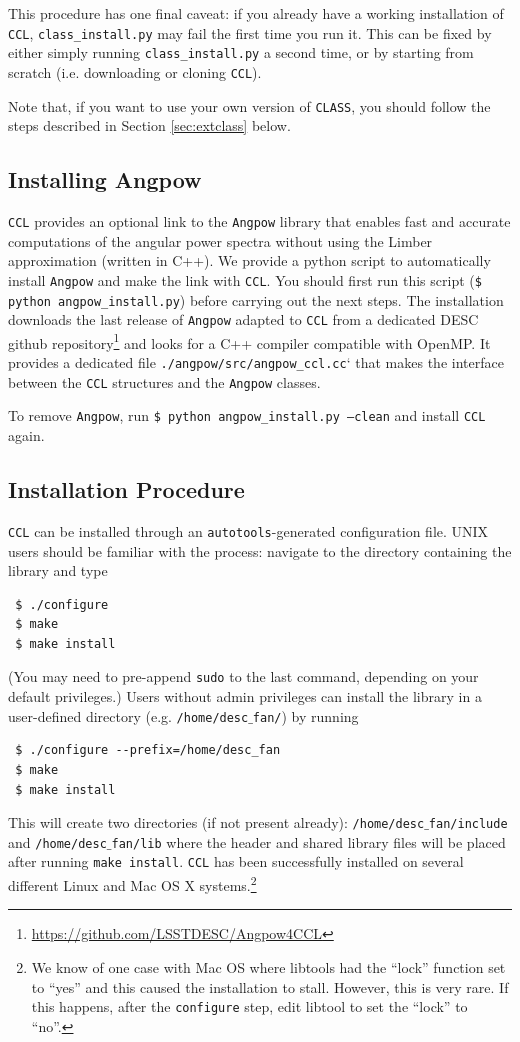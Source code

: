 \documentclass[\docopts]{\docclass}
\newcommand{\ccl}{{\tt CCL}\xspace}
\begin{document}
  This procedure has one final caveat: if you already have a working installation of {\tt CCL}, {\tt class\_install.py} may fail the first time you run it. This can be fixed by either simply running {\tt class\_install.py} a second time, or by starting from scratch (i.e. downloading or cloning {\tt CCL}).

  Note that, if you want to use your own version of {\tt CLASS}, you should follow the steps described in Section \ref{sec:extclass} below.

\subsection{Installing Angpow}

{\tt CCL} provides an optional link to the {\tt Angpow} library that enables fast and accurate computations of the angular power spectra without using the Limber approximation (written in C++). We provide a python script to automatically install {\tt Angpow} and make the link with {\tt CCL}. You should first run this script ({\tt \$ python angpow\_install.py}) before carrying out the next steps. The installation downloads the last release of {\tt Angpow} adapted to {\tt CCL} from a dedicated DESC github repository\footnote{\url{https://github.com/LSSTDESC/Angpow4CCL}} and looks for a C++ compiler compatible with OpenMP. It provides a dedicated file {\tt ./angpow/src/angpow\_ccl.cc}` that makes the interface between the {\tt CCL} structures and the {\tt Angpow} classes.

To remove {\tt Angpow}, run {\tt \$ python angpow\_install.py --clean} and install {\tt CCL} again.



\subsection{Installation Procedure}

\ccl can be installed through an {\tt autotools}-generated configuration file. UNIX users should be familiar with the process: navigate to the directory containing the library and type
\begin{verbatim}
 $ ./configure
 $ make
 $ make install
\end{verbatim}
(You may need to pre-append {\tt sudo} to the last command, depending on your default privileges.) Users without admin privileges can install the library in a user-defined directory (e.g. {\tt /home/desc$\_$fan/}) by running
\begin{verbatim}
 $ ./configure --prefix=/home/desc_fan
 $ make
 $ make install
\end{verbatim}
This will create two directories (if not present already): {\tt /home/desc$\_$fan/include} and {\tt /home/desc$\_$fan/lib} where the header and shared library files will be placed after running {\tt make install}. \ccl has been successfully installed on several different Linux and Mac OS X systems.\footnote{We know of one case with Mac OS where libtools had the ``lock'' function set to ``yes'' and this caused the installation to stall. However, this is very rare. If this happens, after the {\tt configure} step, edit libtool to set the ``lock'' to ``no''.}
\end{document}
